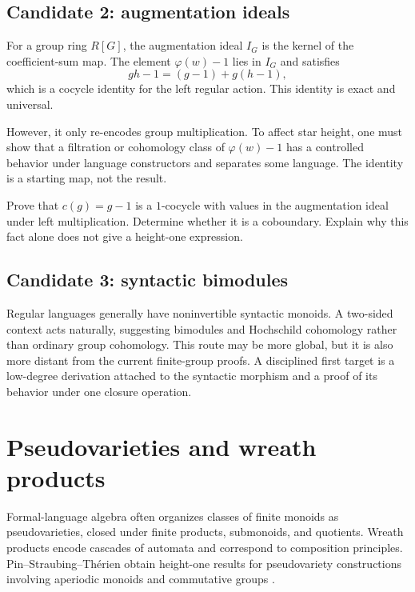 \documentclass{amsart}
\begin{document}
\subsection{Candidate 2: augmentation ideals}

For a group ring $R[G]$, the augmentation ideal $I_G$ is the kernel of the coefficient-sum map.  The element $\varphi(w)-1$ lies in $I_G$ and satisfies
\[
  gh-1=(g-1)+g(h-1),
\]
which is a cocycle identity for the left regular action.  This identity is exact and universal.

However, it only re-encodes group multiplication.  To affect star height, one must show that a filtration or cohomology class of $\varphi(w)-1$ has a controlled behavior under language constructors and separates some language.  The identity is a starting map, not the result.

\begin{exercise}
Prove that $c(g)=g-1$ is a $1$-cocycle with values in the augmentation ideal under left multiplication.  Determine whether it is a coboundary.  Explain why this fact alone does not give a height-one expression.
\end{exercise}

\subsection{Candidate 3: syntactic bimodules}

Regular languages generally have noninvertible syntactic monoids.  A two-sided context acts naturally, suggesting bimodules and Hochschild cohomology rather than ordinary group cohomology.  This route may be more global, but it is also more distant from the current finite-group proofs.  A disciplined first target is a low-degree derivation attached to the syntactic morphism and a proof of its behavior under one closure operation.

\section{Pseudovarieties and wreath products}

Formal-language algebra often organizes classes of finite monoids as pseudovarieties, closed under finite products, submonoids, and quotients.  Wreath products encode cascades of automata and correspond to composition principles.  Pin--Straubing--Th\'erien obtain height-one results for pseudovariety constructions involving aperiodic monoids and commutative groups \cite{pinStraubingTherien1992}.
\end{document}
